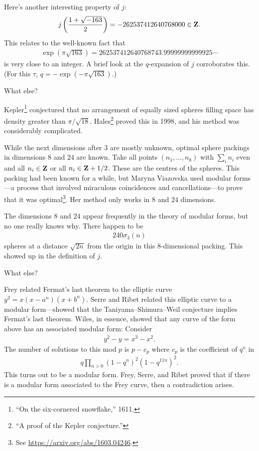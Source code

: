 \documentclass[11pt, oneside,margin=1in]{article}
\begin{document}
Here's another interesting property of $j$:
\begin{align*}
	j\left( \frac{1+\sqrt{-163} }{2} \right) = -262537412640768000\in \mathbf Z.
\end{align*}
This relates to the well-known fact that 
\begin{align*}
	\exp(\pi \sqrt{163} ) = 262537412640768743.99999999999925\cdots
\end{align*}
is very close to an integer. A brief look at the $q$-expansion of $j$ corroborates this. (For this $\tau$, $q=-\exp(-\pi\sqrt{163} )$.)

What else?

\begin{example}\label{}\text{}
Kepler\footnote{``On the six-cornered snowflake,'' 1611.} conjectured that no arrangement of equally sized spheres filling space has density greater than $\pi/\sqrt{18}$. Hales\footnote{``A proof of the Kepler conjecture.''} proved this in 1998, and his method was considerably complicated. 

While the next dimensions after $3$ are mostly unknown, optimal sphere packings in dimensions $8$ and $24$ are known. Take all points $(n_1,\hdots, n_8)$ with $\sum_{i}^{} n_i$ even and all $n_i\in \mathbf Z$ or all $n_i\in \mathbf Z + 1/2$. These are the centres of the spheres. This packing had been known for a while, but Maryna Viazovska used modular forms---a process that involved miraculous coincidences and cancellations---to prove that it was optimal\footnote{See \url{https://arxiv.org/abs/1603.04246}.}. Her method only works in $8$ and $24$ dimensions.

The dimensions $8$ and $24$ appear frequently in the theory of modular forms, but no one really knows why. There happen to be
\begin{align*}
	240\sigma_3(n)
\end{align*}
spheres at a distance $\sqrt{2n} $ from the origin in this $8$-dimensional packing. This showed up in the definition of $j$.
\end{example}


What else? 
\begin{example}\label{}\text{}
Frey related Fermat's last theorem to the elliptic curve $y^2 = x(x-a^n) (x+b^n)$. Serre and Ribet related this elliptic curve to a modular form---showed that the Taniyama--Shimura--Weil conjecture implies Fermat's last theorem. Wiles, in essence, showed that any curve of the form above has an associated modular form: Consider
\begin{align*}
	y^2 - y = x^3-x^2.
\end{align*}
The number of solutions to this mod $p$ is $p-c_p$ where $c_p$ is the coefficient of $q^n$ in 
\begin{align*}
	q\prod_{n>0} (1-q^n)^2 (1-q^{11n})^2.
\end{align*}
This turns out to be a modular form. Frey, Serre, and Ribet proved that if there is a modular form associated to the Frey curve, then a contradiction arises. 
\end{example}
\end{document}
